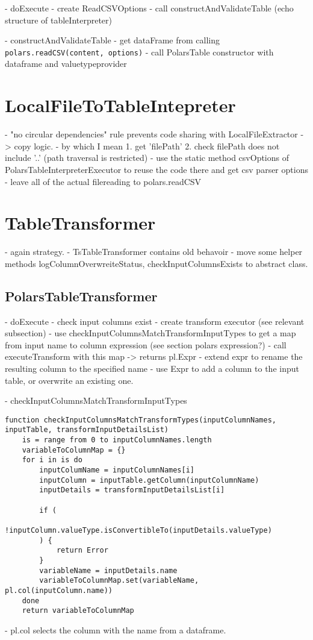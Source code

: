 - doExecute
- create ReadCSVOptions
- call constructAndValidateTable (echo structure of tableInterpreter)

- constructAndValidateTable
- get dataFrame from calling \Verb|polars.readCSV(content, options)|
- call PolarsTable constructor with dataframe and valuetypeprovider

\section{LocalFileToTableIntepreter}
- "no circular dependencies" rule prevents code sharing with LocalFileExtractor -> copy logic.
- by which I mean 1. get 'filePath' 2. check filePath does not include '..' (path traversal is restricted)
- use the static method csvOptions of PolarsTableInterpreterExecutor to reuse the code there and get csv parser options
- leave all of the actual filereading to polars.readCSV


\section{TableTransformer}
- again strategy.
- TsTableTransformer contains old behavoir
- move some helper methods logColumnOverwreiteStatus, checkInputColumnsExists to abstract class.

\subsection{PolarsTableTransformer}
- doExecute
- check input columns exist
- create transform executor (see relevant subsection)
- use checkInputColumnsMatchTransformInputTypes to get a map from input name to column expression (see section polars expression?)
- call executeTransform with this map -> returns pl.Expr
- extend expr to rename the resulting column to the specified name
- use Expr to add a column to the input table, or overwrite an existing one.


- checkInputColumnsMatchTransformInputTypes
\begin{listing}
	\begin{verbatim}
function checkInputColumnsMatchTransformTypes(inputColumnNames, inputTable, transformInputDetailsList)
	is = range from 0 to inputColumnNames.length
	variableToColumnMap = {}
	for i in is do
		inputColumName = inputColumnNames[i]
		inputColumn = inputTable.getColumn(inputColumnName)
		inputDetails = transformInputDetailsList[i]

		if (
			!inputColumn.valueType.isConvertibleTo(inputDetails.valueType)
		) {
			return Error
		}
		variableName = inputDetails.name
		variableToColumnMap.set(variableName, pl.col(inputColumn.name))
	done
	return variableToColumnMap
	\end{verbatim}
\end{listing}
- pl.col selects the column with the name from a dataframe.


